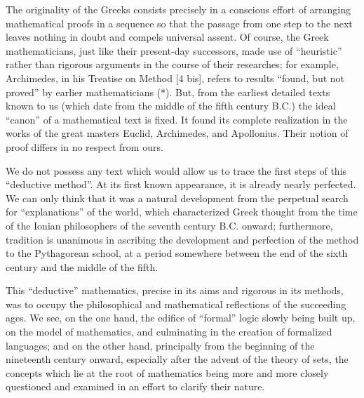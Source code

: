 The originality of the Greeks consists precisely in a conscious effort of arranging mathematical proofs in a sequence so that the passage from one step to the next leaves nothing in doubt and compels universal assent. Of course, the Greek mathematicians, just like their present-day successors, made use of ``heuristic'' rather than rigorous arguments in the course of their researches; for example, Archimedes, in his Treatise on Method {[}4 bis{]}, refers to results ``found, but not proved'' by earlier mathematicians (*). But, from the earliest detailed texts known to us (which date from the middle of the fifth century B.C.) the ideal ``canon'' of a mathematical text is fixed. It found its complete realization in the works of the great masters Euclid, Archimedes, and Apollonius. Their notion of proof differs in no respect from ours.

We do not possess any text which would allow us to trace the first steps of this ``deductive method''. At its first known appearance, it is already nearly perfected. We can only think that it was a natural development from the perpetual search for ``explanations'' of the world, which characterized Greek thought from the time of the Ionian philosophers of the seventh century B.C. onward; furthermore, tradition is unanimous in ascribing the development and perfection of the method to the Pythagorean school, at a period somewhere between the end of the sixth century and the middle of the fifth.

This ``deductive'' mathematics, precise in its aims and rigorous in its methods, was to occupy the philosophical and mathematical reflections of the succeeding ages. We see, on the one hand, the edifice of ``formal'' logic slowly being built up, on the model of mathematics, and culminating in the creation of formalized languages; and on the other hand, principally from the beginning of the nineteenth century onward, especially after the advent of the theory of sets, the concepts which lie at the root of mathematics being more and more closely questioned and examined in an effort to clarify their nature.

